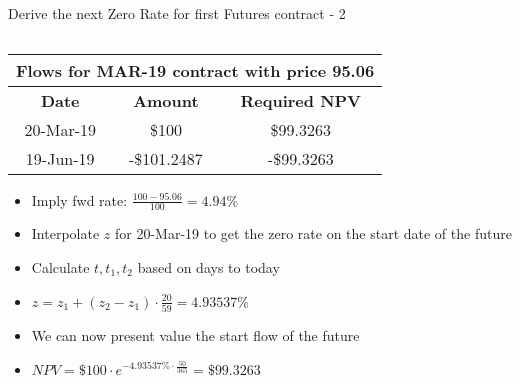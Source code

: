 \documentclass[handout, aspectratio=169]{beamer}
\begin{document}
\begin{frame}{Derive the next Zero Rate for first Futures contract - 2}
\begin{columns}[T]
		\begin{column}{0.7\textwidth}
			\begin{table}[t]
				\centering
				\begin{adjustbox}{max width=0.6\textwidth}
					\begin{tabular}{|c|c|c|} 
						\hline
						\multicolumn{3}{|c|}{\textbf{Flows for MAR-19 contract with price 95.06}} \\
						\hline
						\textbf{Date} & \textbf{Amount}  & \textbf{Required NPV}\\				
						\hline
						20-Mar-19 & \$100 & \$99.3263 \\
						\hline
						19-Jun-19 & -\$101.2487 & -\$99.3263 \\
						\hline
					\end{tabular}
				\end{adjustbox}
			\end{table}
			\begin{itemize}
				\footnotesize
				\item Imply fwd rate: $\frac{100 - 95.06}{100} = 4.94\%$
			 	\item Interpolate $z$ for 20-Mar-19 to get the zero rate on the start date of the future
		 		\item Calculate $t, t_1, t_2$ based on days to today
		 		\item $z = z_1 + (z_2 - z_1) \cdot \frac{20}{59} = 4.93537\%$
		 		\item We can now present value the start flow of the future
		 		\item $NPV = \$100 \cdot e^{-4.93537\% \cdot \frac{50}{365}} = \$99.3263$ 
			\end{itemize}
		 \end{column}
	\end{columns}
\end{frame}
\end{document}

